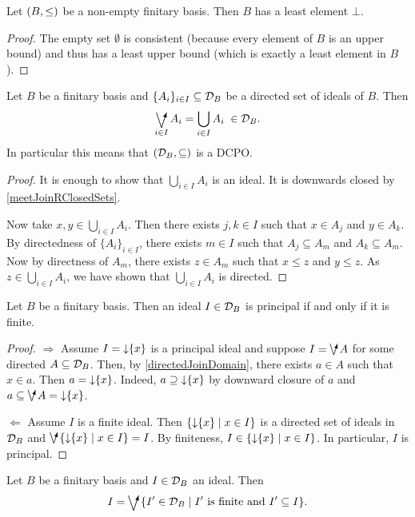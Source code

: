\begin{lemma}
Let $\sSet{B,\leq}$ be a non-empty finitary basis. Then $B$ has a least element $\bot$.
\end{lemma}
\begin{proof}
The empty set $\emptyset$ is consistent (because every element of $B$ is an upper bound) and thus has a least upper bound (which is exactly a least element in $B$).
\end{proof}

\begin{proposition} \label{directedJoinDomain}
Let $B$ be a finitary basis and $\{A_i\}_{i\in I} \subseteq \mathcal{D}_B$ be a directed set of ideals of $B$. Then
\[ \dirvee_{i\in I} A_i = \bigcup_{i\in I}A_i \;\in \domain_B. \]
In particular this means that $\sSet{\domain_B, \subseteq}$ is a DCPO.
\end{proposition}
\begin{proof}
It is enough to show that $\bigcup_{i\in I}A_i$ is an ideal. It is downwards closed by \ref{meetJoinRClosedSets}.

Now take $x,y\in \bigcup_{i\in I}A_i$. Then there exists $j,k\in I$ such that $x\in A_j$ and $y\in A_k$. By directedness of $\{A_i\}_{i\in I}$, there exists $m\in I$ such that $A_j\subseteq A_m$ and $A_k \subseteq A_m$. Now by directness of $A_m$, there exists $z\in A_m$ such that $x\leq z$ and $y\leq z$. As $z\in \bigcup_{i\in I}A_i$, we have shown that $\bigcup_{i\in I}A_i$ is directed.
\end{proof}

\begin{proposition}
Let $B$ be a finitary basis. Then an ideal $I\in\mathcal{D}_B$ is principal \textup{if and only if} it is finite.
\end{proposition}
\begin{proof}
$\boxed{\Rightarrow}$ Assume $I = \operatorname{\downarrow}\{x\}$ is a principal ideal and suppose $I = \dirvee A$ for some directed $A\subseteq \mathcal{D}_B$. Then, by \ref{directedJoinDomain}, there exists $a\in A$ such that $x\in a$. Then $a = \operatorname{\downarrow}\{x\}$. Indeed, $a \supseteq \operatorname{\downarrow}\{x\}$ by downward closure of $a$ and  $a\subseteq\dirvee A = \downset\{x\}$.

$\boxed{\Leftarrow}$ Assume $I$ is a finite ideal. Then $\setbuilder{\downset\{x\}}{x\in I}$ is a directed set of ideals in $\mathcal{D}_B$ and $\dirvee\setbuilder{\downset\{x\}}{x\in I} = I$. By finiteness, $I\in \setbuilder{\downset\{x\}}{x\in I}$. In particular, $I$ is principal.
\end{proof}
\begin{corollary} \label{finiteDecompositionIdeal}
Let $B$ be a finitary basis and $I\in\mathcal{D}_B$ an ideal. Then
\[ I = \dirvee \setbuilder{I'\in \domain_B}{\text{$I'$ is finite and $I'\subseteq I$}}. \]
\end{corollary}

